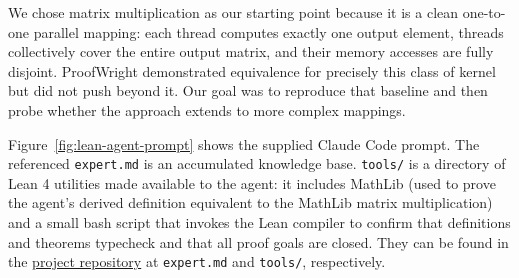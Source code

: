 \documentclass{article}
\begin{document}
We chose matrix multiplication as our starting point because it is a clean one-to-one parallel mapping: each thread computes exactly one output element, threads collectively cover the entire output matrix, and their memory accesses are fully disjoint. ProofWright demonstrated equivalence for precisely this class of kernel but did not push beyond it. Our goal was to reproduce that baseline and then probe whether the approach extends to more complex mappings.

Figure~\ref{fig:lean-agent-prompt} shows the supplied Claude Code prompt. The referenced \texttt{expert.md} is an accumulated knowledge base. \texttt{tools/} is a directory of Lean 4 utilities made available to the agent: it includes MathLib (used to prove the agent's derived definition equivalent to the MathLib matrix multiplication) and a small bash script that invokes the Lean compiler to confirm that definitions and theorems typecheck and that all proof goals are closed. They can be found in the \href{https://github.com/cscaff/COMSE6901-Experiment-Repo/tree/main}{project repository} at \texttt{expert.md} and \texttt{tools/}, respectively. 
\end{document}
